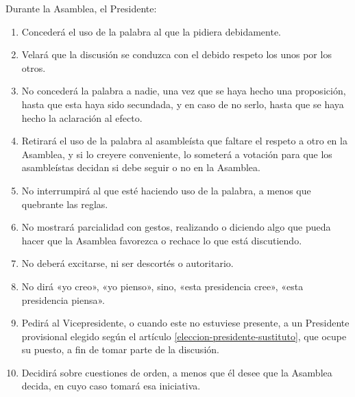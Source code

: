 \article
Durante la Asamblea, el Presidente:
\begin{enumerate}[label=\alph*),noitemsep]
    \item Concederá el uso de la palabra al que la pidiera debidamente.
    \item Velará que la discusión se conduzca con el debido respeto los unos por los otros.
    \item No concederá la palabra a nadie, una vez que se haya hecho una proposición, hasta que esta haya sido secundada, y en caso de no serlo, hasta que se haya hecho la aclaración al efecto.
    \item Retirará el uso de la palabra al asambleísta que faltare el respeto a otro en la Asamblea, y si lo creyere conveniente, lo someterá a votación para que los asambleístas decidan si debe seguir o no en la Asamblea.
    \item No interrumpirá al que esté haciendo uso de la palabra, a menos que quebrante las reglas.
    \item No mostrará parcialidad con gestos, realizando o diciendo algo que pueda hacer que la Asamblea favorezca o rechace lo que está discutiendo.
    \item No deberá excitarse, ni ser descortés o autoritario.
    \item No dirá «yo creo», «yo pienso», sino, «esta presidencia cree», «esta presidencia piensa».
    \item Pedirá al Vicepresidente, o cuando este no estuviese presente, a un Presidente provisional elegido según el artículo \ref{eleccion-presidente-sustituto}, que ocupe su puesto, a fin de tomar parte de la discusión.
    \item Decidirá sobre cuestiones de orden, a menos que él desee que la Asamblea decida, en cuyo caso tomará esa iniciativa.
\end{enumerate}

